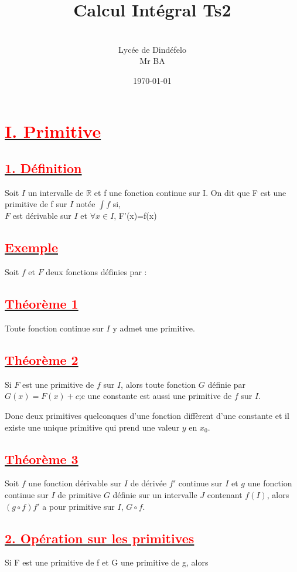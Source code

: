 \documentclass[12pt]{article}
\author{\\Lycée de Dindéfelo\\Mr BA}
\title{\textbf{Calcul Intégral Ts2}}
\date{\today}
\begin{document}
\maketitle
\newpage
\section*{\underline{\textbf{\textcolor{red}{I. Primitive }}}}
\subsection*{\underline{\textbf{\textcolor{red}{1. Définition}}}}
Soit $I$ un intervalle de $\mathbb{R}$  et  f une fonction continue sur I. On dit que F est une primitive de f sur $I$ notée $\int f $ si,\\ $F$ est dérivable sur $I$ et $\forall x \in I$, F'(x)=f(x)
\subsection*{\underline{\textbf{\textcolor{red}{Exemple}}}}
Soit $f$  et  $F$ deux fonctions définies par : 
\subsection*{\underline{\textbf{\textcolor{red}{Théorème 1}}}}
Toute fonction continue sur $I$ y admet une primitive.
\subsection*{\underline{\textbf{\textcolor{red}{Théorème 2}}}}
Si $F$ est une primitive de $f$ sur $I$, alors toute fonction $G$ définie par
$G(x)=F(x)+c$;c une constante est aussi une primitive de $f$ sur $I$.
 
Donc deux primitives quelconques d'une fonction diffèrent d'une constante et il existe une unique primitive qui prend une valeur $y$ en $x_{0}$.
\subsection*{\underline{\textbf{\textcolor{red}{Théorème 3}}}}

Soit $f$ une fonction dérivable sur $I$ de dérivée $f'$ continue sur $I$ et $g$ une fonction continue sur $I$ de primitive $G$ définie sur un intervalle $J$ contenant $f(I)$, alors $(g\circ f)f'$ a pour primitive sur $I$, $G\circ f$.
\subsection*{\underline{\textbf{\textcolor{red}{2. Opération sur les primitives}}}}
Si F est une primitive de f et G une primitive de g, alors 
\end{document}
